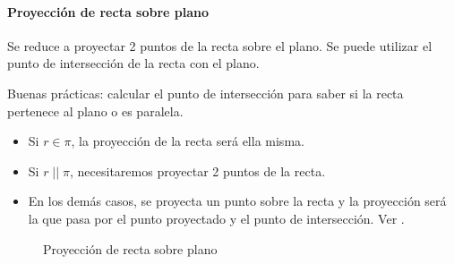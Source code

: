 \paragraph{Proyección de recta sobre plano}

Se reduce a proyectar 2 puntos de la recta sobre el plano. Se puede utilizar el punto de intersección de la recta con el plano.

\obs Buenas prácticas: calcular el punto de intersección para saber si la recta pertenece al plano o es paralela. 
\begin{itemize}
  \item Si $r\in\pi$, la proyección de la recta será ella misma.
  \item Si $r\;||\;\pi$, necesitaremos proyectar 2 puntos de la recta.
  \item En los demás casos, se proyecta un punto sobre la recta y la proyección será la que pasa por el punto proyectado y el punto de intersección. Ver .
\end{itemize}

\begin{figure}[H]
\centering
{}

\caption{Proyección de recta sobre plano}
\label{fig::proy::recta-plano}
\end{figure}


